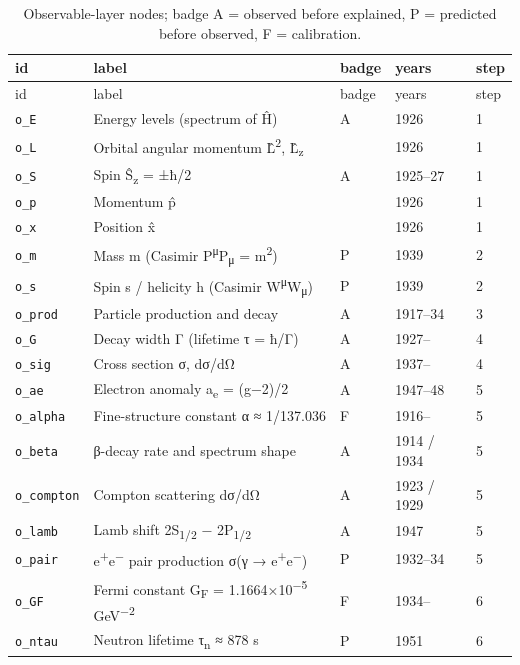 \begin{longtable}{@{}l>{\raggedright\arraybackslash}p{7.6cm}lll@{}}
\caption{Observable-layer nodes; badge A = observed before explained, P = predicted before observed, F = calibration.}\label{tab:nodesO}\\
\toprule id & label & badge & years & step\\\midrule\endfirsthead
\toprule id & label & badge & years & step\\\midrule\endhead
\bottomrule\endfoot
\texttt{o\_E} & Energy levels (spectrum of Ĥ) & A & 1926 & 1\\
\texttt{o\_L} & Orbital angular momentum L̂\textsuperscript{2}, L̂\textsubscript{z} &  & 1926 & 1\\
\texttt{o\_S} & Spin Ŝ\textsubscript{z} = ±ħ/2 & A & 1925–27 & 1\\
\texttt{o\_p} & Momentum p̂ &  & 1926 & 1\\
\texttt{o\_x} & Position x̂ &  & 1926 & 1\\
\texttt{o\_m} & Mass m (Casimir P\textsuperscript{μ}P\textsubscript{μ} = m\textsuperscript{2}) & P & 1939 & 2\\
\texttt{o\_s} & Spin s / helicity h (Casimir W\textsuperscript{μ}W\textsubscript{μ}) & P & 1939 & 2\\
\texttt{o\_prod} & Particle production and decay & A & 1917–34 & 3\\
\texttt{o\_G} & Decay width Γ (lifetime τ = ħ/Γ) & A & 1927– & 4\\
\texttt{o\_sig} & Cross section σ, dσ/dΩ & A & 1937– & 4\\
\texttt{o\_ae} & Electron anomaly a\textsubscript{e} = (g−2)/2 & A & 1947–48 & 5\\
\texttt{o\_alpha} & Fine-structure constant α ≈ 1/137.036 & F & 1916– & 5\\
\texttt{o\_beta} & β-decay rate and spectrum shape & A & 1914 / 1934 & 5\\
\texttt{o\_compton} & Compton scattering dσ/dΩ & A & 1923 / 1929 & 5\\
\texttt{o\_lamb} & Lamb shift 2S\textsubscript{1/2} − 2P\textsubscript{1/2} & A & 1947 & 5\\
\texttt{o\_pair} & e\textsuperscript{+}e\textsuperscript{−} pair production σ(γ → e\textsuperscript{+}e\textsuperscript{−}) & P & 1932–34 & 5\\
\texttt{o\_GF} & Fermi constant G\textsubscript{F} = 1.1664×10\textsuperscript{−5} GeV\textsuperscript{−2} & F & 1934– & 6\\
\texttt{o\_ntau} & Neutron lifetime τ\textsubscript{n} ≈ 878 s & P & 1951 & 6\\

\end{longtable}
